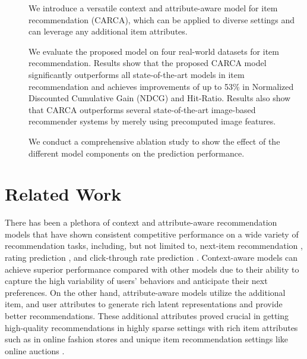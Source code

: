 \documentclass[sigconf,natbib=true]{acmart}
\begin{document}
\begin{description}
 \item[] We introduce a versatile context and attribute-aware model for item recommendation (CARCA), which can be applied to diverse settings and can leverage any additional item attributes.
 \item[] We evaluate the proposed model on four real-world datasets for item recommendation. Results show that the proposed CARCA model significantly outperforms all state-of-the-art models in item recommendation and achieves improvements of up to 53\% in Normalized Discounted Cumulative Gain (NDCG) and Hit-Ratio. Results also show that CARCA outperforms several state-of-the-art image-based recommender systems by merely using precomputed image features.
 \item[] 
We conduct a comprehensive ablation study to show the effect of the different model components on the prediction performance.
\end{description}

\section{Related Work}
There has been a plethora of context and attribute-aware recommendation models that have shown consistent competitive performance on a wide variety of recommendation tasks, including, but not limited to, next-item recommendation \cite{rashed2020multirec,sun2019bert4rec,ZhouWZZWZWW20,zhang2019feature,wu2019stochastic}, rating prediction \cite{rashed2019attribute,rendle2010factorization,zhang2017autosvd++}, and click-through rate prediction \cite{guo2017deepfm,zhou2018deep,xin2019cfm,zhou2019deep}. Context-aware models \cite{rendle2010factorization,guo2017deepfm,zhou2018deep,xin2019cfm,zhou2019deep} can achieve superior performance compared with other models due to their ability to capture the high variability of users' behaviors and anticipate their next preferences. On the other hand, attribute-aware models \cite{he2016vbpr,rashed2019attribute,zhang2017autosvd++,rashed2020multirec,ZhouWZZWZWW20,zhang2019feature} utilize the additional item, and user attributes to generate rich latent representations and provide better recommendations.
These additional attributes proved crucial in getting high-quality recommendations in highly sparse settings with rich item attributes such as in online fashion stores \cite{he2016vbpr} and unique item recommendation settings like online auctions \cite{rashed2020multirec}.
\end{document}

